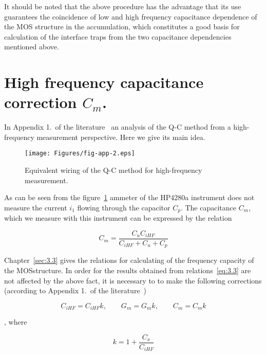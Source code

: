 It should be noted that the above procedure has the advantage that its
use guarantees the coincidence of low and high frequency capacitance
dependence of the MOS structure in the accumulation, which constitutes
a good basis for calculation of the interface traps from the two
capacitance dependencies mentioned above.

\section{High frequency capacitance correction $C_m$.}\label{sec:E.4}

In Appendix 1.\ of the literature~\cite{App.2} an analysis of the Q-C
method from a high-frequency measurement perspective. Here we give its
main idea.

\begin{figure}[h!]\centering
  \texttt{[image: Figures/fig-app-2.eps]}
  \caption[Equivalent wiring of the Q-C method for high-frequency
    measurements]{Equivalent wiring of the Q-C method for
    high-frequency measurement.}\label{fig:App.2}
\end{figure}

As can be seen from the figure~\ref{fig:App.2} ammeter of the HP4280a
instrument does not measure the current $i_1$ flowing through the
capacitor $C_p$. The capacitance $C_m$, which we measure with this
instrument can be expressed by the relation

\begin{equation}\label{eq:E.6}
  C_m = \frac{C_{u} C_{iHF}} {C_{iHF}+C_{u}+C_{p}}
\end{equation}

Chapter~\ref{sec:3.3} gives the relations for calculating of the
frequency capacity of the MOS\@ structure.  In order for the results
obtained from relations~\ref{eq:3.3} are not affected by the above
fact, it is necessary to to make the following corrections (according
to Appendix 1.\ of the literature~\cite{App.4})

\begin{equation}\label{eq:E.7}
  C_{iHF}=C_{iHF}k, \qquad G_{m}=G_{m}k, \qquad C_{m}=C_{m}k
\end{equation}

, where

\begin{equation}\label{eq:E.8}
  k = 1 + \frac{C_x}{C_{iHF}}
\end{equation}
